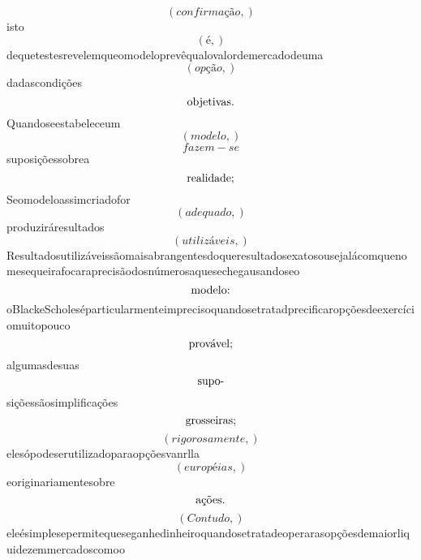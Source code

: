 \documentclass{article}
\begin{document}
\begin{equation}
\left( confirmação,\right)
\end{equation}isto\begin{equation}
\left( é,\right)
\end{equation}dequetestesrevelemqueomodeloprevêqualovalordemercadodeuma\begin{equation}
\left( opção,\right)
\end{equation}dadascondições\begin{equation}
$objetivas.$
\end{equation}Quandoseestabeleceum\begin{equation}
\left( modelo,\right)
\end{equation}\begin{equation}
fazem - se
\end{equation}suposiçõessobrea\begin{equation}
$realidade;$
\end{equation}Seomodeloassimcriadofor\begin{equation}
\left( adequado,\right)
\end{equation}produziráresultados\begin{equation}
\left( utilizáveis,\right)
\end{equation}Resultadosutilizáveissãomaisabrangentesdoqueresultadosexatosousejalácomquenomesequeirafocaraprecisãodosnúmerosaquesechegausandoseo\begin{equation}
$modelo:$
\end{equation}oBlackeScholeséparticularmenteimprecisoquandosetratadprecificaropçõesdeexercíciomuitopouco\begin{equation}
$provável;$
\end{equation}algumasdesuas\begin{equation}
$supo-$
\end{equation}siçõessãosimplificações\begin{equation}
$grosseiras;$
\end{equation}\begin{equation}
\left( rigorosamente,\right)
\end{equation}elesópodeserutilizadoparaopçõesvanrlla\begin{equation}
\left( européias,\right)
\end{equation}eoriginariamentesobre\begin{equation}
$ações.$
\end{equation}\begin{equation}
\left( Contudo,\right)
\end{equation}eleésimplesepermitequeseganhedinheiroquandosetratadeoperarasopçõesdemaiorliquidezemmercadoscomoo\begin{equation}

\end{equation}
\end{document}
